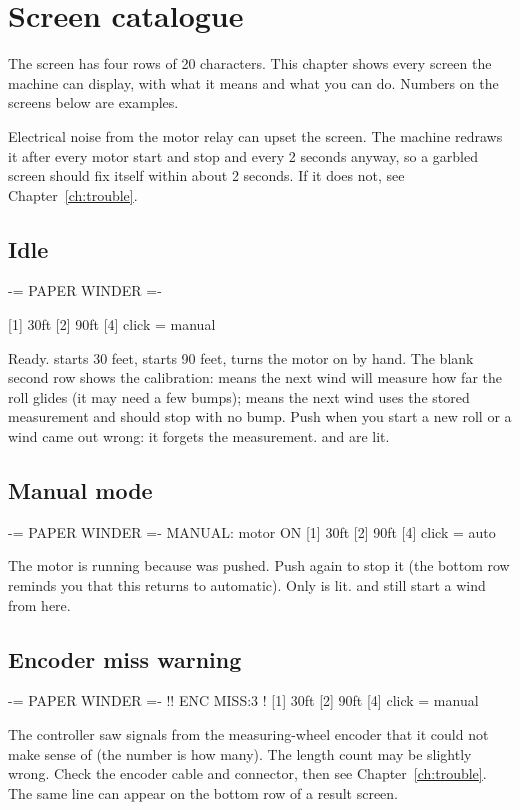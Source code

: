 \chapter{Screen catalogue}\label{ch:screens}

The screen has four rows of 20 characters. This chapter shows every screen
the machine can display, with what it means and what you can do. Numbers on
the screens below are examples.

\begin{note}
Electrical noise from the motor relay can upset the screen. The machine
redraws it after every motor start and stop and every 2 seconds anyway, so a
garbled screen should fix itself within about 2 seconds. If it does not, see
Chapter~\ref{ch:trouble}.
\end{note}

\section{Idle}\label{sec:screen-idle}
\begin{lcd}
 -= PAPER WINDER =-

[1] 30ft    [2] 90ft
[4] click = manual
\end{lcd}
Ready.  starts 30 feet,  starts 90 feet,  turns the
motor on by hand. The blank second row shows the calibration:
 means the next wind will measure how far the roll
glides (it may need a few bumps);  means the next
wind uses the stored measurement and should stop with no bump. Push  when
you start a new roll or a wind came out wrong: it forgets the measurement.  and  are lit.

\section{Manual mode}
\begin{lcd}
 -= PAPER WINDER =-
MANUAL: motor ON
[1] 30ft    [2] 90ft
[4] click = auto
\end{lcd}
The motor is running because  was pushed. Push  again to stop
it (the bottom row reminds you that this returns to automatic). Only 
is lit.  and  still start a wind from here.

\section{Encoder miss warning}\label{sec:encmiss}
\begin{lcd}
 -= PAPER WINDER =-
!! ENC MISS:3      !
[1] 30ft    [2] 90ft
[4] click = manual
\end{lcd}
The controller saw signals from the measuring-wheel encoder that it could not
make sense of (the number is how many). The length count may be slightly
wrong. Check the encoder cable and connector, then see
Chapter~\ref{ch:trouble}. The same line can appear on the bottom row of a
result screen.

